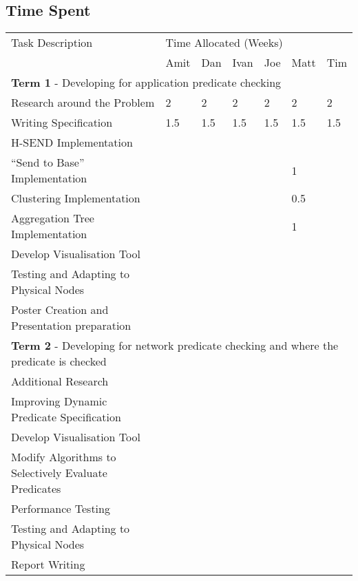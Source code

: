 \subsection{Time Spent}

\begin{table}[H]
	\centering
	\begin{tabular}{| l | l | l | l | l | l | l |}
	\hline
	Task Description & \multicolumn{6}{|l|}{Time Allocated (Weeks)}\\
	~ & Amit & Dan & Ivan & Joe & Matt & Tim \\
	\hline
	\hline
	\multicolumn{7}{|l|}{\textbf{Term 1} - Developing for application predicate checking} \\
	\hline


	Research around the Problem & 2 & 2 & 2 & 2 & 2 & 2\\
	Writing Specification & 1.5 & 1.5 & 1.5 & 1.5 & 1.5 & 1.5\\
	H-SEND Implementation & ~ & ~ & ~ & ~ & ~ & ~\\
	``Send to Base'' Implementation & ~ & ~ & ~ & ~ & 1 & ~\\
	Clustering Implementation & ~ & ~ & ~ & ~ & 0.5 & ~\\
	Aggregation Tree Implementation & ~ & ~ & ~ & ~ & 1 & ~\\
	Develop Visualisation Tool & ~ & ~ & ~ & ~ & ~ & ~\\
	Testing and Adapting to Physical Nodes & ~ & ~ & ~ & ~ & ~ & ~\\
	Poster Creation and Presentation preparation & ~ & ~ & ~ & ~ & ~ & ~\\

	\hline
	\hline
	\multicolumn{7}{|l|}{\textbf{Term 2} - Developing for network predicate checking and where the predicate is checked} \\
	\hline
	
	Additional Research & ~ & ~ & ~ & ~ & ~ & ~\\
	Improving Dynamic Predicate Specification & ~ & ~ & ~ & ~ & ~ & ~\\
	Develop Visualisation Tool & ~ & ~ & ~ & ~ & ~ & ~\\
	Modify Algorithms to Selectively Evaluate Predicates & ~ & ~ & ~ & ~ & ~ & ~\\
	Performance Testing & ~ & ~ & ~ & ~ & ~ & ~\\
	Testing and Adapting to Physical Nodes & ~ & ~ & ~ & ~ & ~ & ~\\
	Report Writing & ~ & ~ & ~ & ~ & ~ & ~\\
	
	\hline
	
	\end{tabular}
\end{table}



